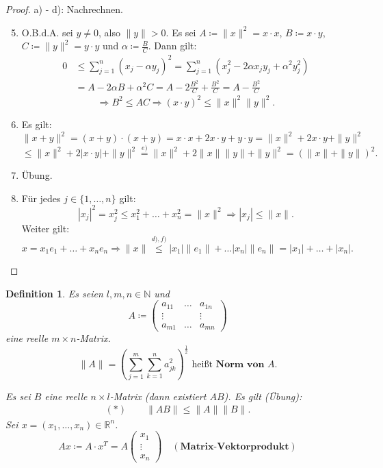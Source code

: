 \documentclass[12pt]{extreport} %
\newcommand{\N}{\mathbb{N}}
\newcommand{\R}{\mathbb{R}}
\theoremstyle{named}
\theoremstyle{itshape}
\newtheorem*{definition}{Definition}
\theoremstyle{normal}
\begin{document}
{\begin{proof}
	a) - d): Nachrechnen.
	\begin{enumerate} \setcounter{enumi}{4}
		\item O.B.d.A. sei $y \neq 0$, also $\| y \| > 0$. Es sei $A \coloneqq \| x \|^{2} = x \cdot x$, $B \coloneqq x \cdot y$, $C \coloneqq \| y \|^{2} = y \cdot y$ und
		$\alpha \coloneqq \frac{B}{C}$. Dann gilt:
			\begin{align*}
				0 & \leq \sum_{j=1}^{n} (x_{j} - \alpha y_{j})^{2} = \sum_{j=1}^{n} \left( x_{j}^{2} - 2\alpha x_{j} y_{j} + \alpha^{2} y_{j}^{2} \right) \\
				  & = A - 2 \alpha B + \alpha^{2} C = A - 2 \frac{B^{2}}{C} + \frac{B^{2}}{C} = A - \frac{B^{2}}{C} 	
			\end{align*}
			$$\Rightarrow B^{2} \leq AC \Rightarrow (x \cdot y)^{2} \leq \|x\|^{2} \|y\|^{2}.$$
		\item Es gilt: $$\|x + y \|^{2} = (x + y) \cdot (x + y) = x \cdot x + 2 x \cdot y + y \cdot y = \| x \|^{2} + 2x \cdot y + \| y \|^{2}$$
			$$  \leq \| x \|^{2} + 2 | x \cdot y | + \| y \|^{2} \overset{e)}{=} \| x \|^{2} + 2 \| x \| \| y \| + \| y \|^{2} = \left( \| x \|+ \| y \| \right)^{2}. $$
		\item Übung.
		\item Für jedes $j \in \{1,\dotsc,n\}$ gilt:
		        $$|x_{j}|^{2} = x_{j}^{2} \leq x_{1}^{2} + \dotsc + x_{n}^{2} = \|x\|^{2} \Rightarrow |x_{j}| \leq \| x \|.$$
		      Weiter gilt: 
			$$ x = x_{1} e_{1} + \dotsc + x_{n} e_{n} \Rightarrow \| x \| 
			\overset{d),f)}{\le} |x_{1}| \| e_{1} \| + \dotsc |x_{n}| \| e_{n} \| = |x_{1}| + \dotsc + |x_{n}|. $$
	\end{enumerate}
\end{proof}

\begin{definition}
	Es seien $l, m, n \in \N$ und $$A \coloneqq \begin{pmatrix} a_{11} & \dotsc	& a_{1n} \\ \vdots & & \vdots \\ a_{m1} & \dotsc & a_{mn} \end{pmatrix}$$
	eine reelle $m \times n$-Matrix.
	$$ \| A \| = \left( \sum_{j=1}^{m} \sum_{k=1}^{n} a_{jk}^{2} \right)^{\frac{1}{2}} \text{ hei{\ss}t} \textbf{ Norm von $A$}.	 $$

	Es sei $B$ eine reelle $n \times l$-Matrix (dann existiert $AB$). Es gilt (Übung):
	\begin{align*}
	(\ast) \quad \quad	\|AB\| \leq \|A\| \|B\|.	
	\end{align*}
	Sei $x = (x_{1}, \dotsc, x_{n}) \in \R^{n}$.
	$$ A x \coloneqq A \cdot x^{T} = A \begin{pmatrix} x_{1} \\ \vdots \\ x_{n} \end{pmatrix} \quad (\textbf{Matrix-Vektorprodukt}) $$
\end{definition}

}
\end{document}
